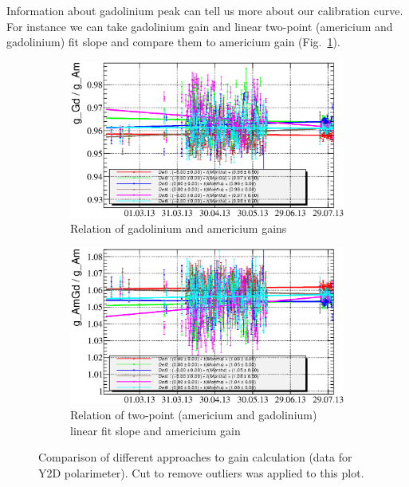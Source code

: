 \documentclass[a4paper]{article}
\begin{document}
Information about gadolinium peak can tell us more about our calibration curve.
For instance we can take gadolinium gain and linear two-point (americium and gadolinium) fit slope
 and compare them to americium gain (Fig.~\ref{fig:gain_relations}).

\begin{figure}[p]
\begin{subfigure}[b]{0.5\textwidth}
\includegraphics[width=\textwidth]{gfx/run13_alpha_study/Y2U/c_chGdGain_over_AmGain_by_day_Y2U.eps}
\caption{Relation of gadolinium and americium gains}
\end{subfigure}
\begin{subfigure}[b]{0.5\textwidth}
\includegraphics[width=\textwidth]{gfx/run13_alpha_study/Y2U/c_chAmGdGain_over_AmGain_by_day_Y2U.eps}
\caption{Relation of two-point (americium and gadolinium) linear fit slope and americium gain}
\end{subfigure}
\caption{Comparison of different approaches to gain calculation (data for Y2D polarimeter).
Cut to remove outliers was applied to this plot.}
\label{fig:gain_relations}
\end{figure}
\end{document}
